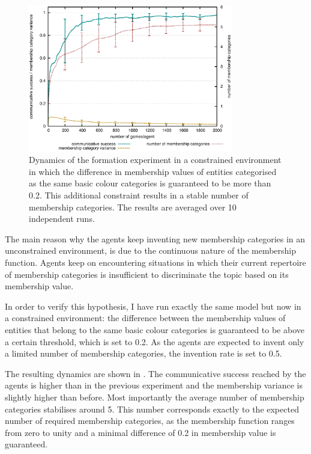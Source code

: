 \begin{figure}[htpb]
  \begin{center}
    \includegraphics[width=0.8\textwidth]{./graded-membership/figures/strict-formation-constrained.pdf} %
    \caption[Dynamics of the formation experiment in a constrained
    environment]{Dynamics of the formation experiment in a
      constrained environment in which the difference in membership
      values of entities categorised as the same basic colour
      categories is guaranteed to be more than 0.2. This additional
      constraint results in a stable number of membership
      categories. The results are averaged over 10 independent runs.}
    \label{f:gm-formation-constrained-dynamics}
  \end{center}
\end{figure}

The main reason why the agents keep inventing new membership
categories in an unconstrained environment, is due to the continuous
nature of the membership function. Agents keep on encountering
situations in which their current repertoire of membership categories
is insufficient to discriminate the topic based on its membership
value. 

In order to verify this hypothesis, I have run exactly the same
model but now in a constrained environment: the difference between the
membership values of entities that belong to the same basic colour
categories is guaranteed to be above a certain threshold, which is set
to 0.2. As the agents are expected to invent only a limited number of
membership categories, the invention rate is set to 0.5.

The resulting dynamics are shown in . The communicative success
reached by the agents is higher than in the previous experiment and
the membership variance is slightly higher than before. Most
importantly the average number of membership categories stabilises
around 5. This number corresponds exactly to the expected number of
required membership categories, as the membership function ranges from
zero to unity and a minimal difference of 0.2 in membership value is
guaranteed.



